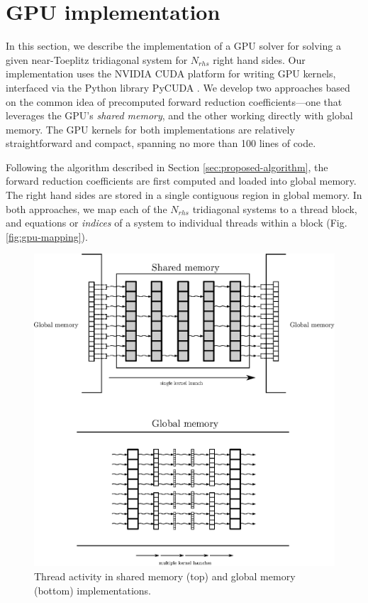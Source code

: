 \documentclass{elsarticle}
\begin{document}
\section{GPU implementation} \label{sec:gpu-implementation}

In this section, we describe the implementation of a GPU solver
for solving a given near-Toeplitz tridiagonal system
for $N_{rhs}$ right hand sides.
Our implementation uses the NVIDIA CUDA platform for writing GPU kernels,
interfaced via the Python library PyCUDA \cite{kloeckner_pycuda_2012}.
We develop two approaches based on the common idea
of precomputed forward reduction coefficients---one that leverages
the GPU's \emph{shared memory},
and the other working directly with global memory.
The GPU kernels for both implementations are relatively
straightforward and compact,
spanning no more than 100 lines of code.

Following the algorithm described in Section \ref{sec:proposed-algorithm},
the forward reduction coefficients
are first computed and loaded into global memory.
The right hand sides are stored in a single
contiguous region in global memory.
In both approaches,
we map each of the $N_{rhs}$ tridiagonal systems
to a thread block,
and equations or \emph{indices} of a system
to individual threads within a block
(Fig. \ref{fig:gpu-mapping}).

\begin{figure}
\begin{center}
\includegraphics[width=400pt]{img/global-and-shared.eps}
\end{center}
\caption{Thread activity in shared memory (top) and global memory (bottom) implementations.}
\label{fig:global-and-shared}
\end{figure}
\end{document}
